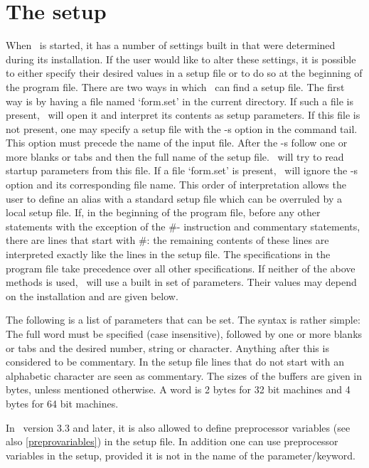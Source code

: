
\chapter{The setup}
\label{setup}

When \FORM\ is started, it has a number of settings built in 
that were determined during its installation. If the 
user would like to alter these settings, it is possible to either specify 
their desired values in a setup file or to do so at the 
beginning of the program file. There are two ways in 
which \FORM\ can find a setup file. The first way is by having a file named 
`form.set' in the current directory. If such a file is 
present, \FORM\ will open it and interpret its contents as setup parameters. 
If this file is not present, one may specify a setup file with the -s 
option in the command tail. This option must precede the name of the input 
file. After the -s follow one or more blanks or tabs and then the full name 
of the setup file. \FORM\ will try to read startup parameters from this file. 
If a file `form.set' is present, \FORM\ will ignore the -s option and its 
corresponding file name. This order of interpretation allows the user to 
define an alias with a standard setup file which can be overruled by a 
local setup file. If, in the beginning of the program file, before any 
other statements with the exception of the \#- instruction and commentary 
statements, there are lines that start with \#: the remaining contents of 
these lines are interpreted exactly like the lines in the setup file. The 
specifications in the program file take precedence over 
all other specifications. If neither of the above methods is used, \FORM\ 
will use a built in set of parameters. Their values may depend on the 
installation and are given below. 

The following is a list of parameters that can be set. The syntax is rather 
simple: The full word must be specified (case insensitive), followed by one 
or more blanks or tabs and the desired number, string or character. 
Anything after this is considered to be commentary. In the setup file lines 
that do not start with an alphabetic character are seen as commentary. The 
sizes of the buffers are given in bytes, unless mentioned otherwise. A word 
is 2 bytes for 32\index{32 bits} bit machines and 4 bytes for 64\index{64 
bits} bit machines.

In \FORM\ version 3.3 and later, it is also allowed to define 
preprocessor variables (see also 
\ref{preprovariables}) in the setup file. In addition one can use 
preprocessor variables in the setup, provided it is not in the name of the 
parameter/keyword.

